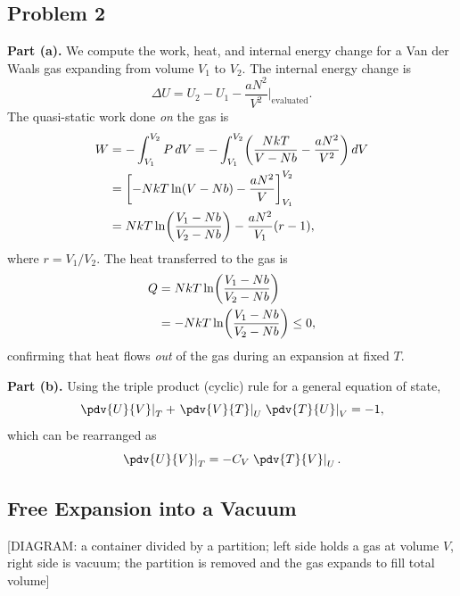 \subsection*{Problem 2}

\textbf{Part (a).} We compute the work, heat, and internal energy change for a Van der Waals gas expanding from volume $V_1$ to $V_2$. The internal energy change is
\begin{equation}
    \Delta U = U_2 - U_1 - \frac{aN^2}{V^2}\bigg|_{\text{evaluated}}.
\end{equation}
The quasi-static work done \emph{on} the gas is
\begin{align}
    W &= -\int_{V_1}^{V_2} P\,dV = -\int_{V_1}^{V_2}\!\left(\frac{NkT}{V - Nb} - \frac{aN^2}{V^2}\right)dV \notag\\
    &= \left[-NkT\ln(V - Nb) - \frac{aN^2}{V}\right]_{V_1}^{V_2} \notag\\
    &= NkT\ln\!\left(\frac{V_1 - Nb}{V_2 - Nb}\right) - \frac{aN^2}{V_1}(r - 1),
\end{align}
where $r = V_1/V_2$. The heat transferred to the gas is
\begin{align}
    Q &= NkT\ln\!\left(\frac{V_1 - Nb}{V_2 - Nb}\right) \notag\\
    &= -NkT\ln\!\left(\frac{V_1 - Nb}{V_2 - Nb}\right) \leq 0,
\end{align}
confirming that heat flows \emph{out} of the gas during an expansion at fixed $T$.

\textbf{Part (b).} Using the triple product (cyclic) rule for a general equation of state,
\begin{equation}
    \left.\pdv{U}{V}\right|_T + \left.\pdv{V}{T}\right|_U \left.\pdv{T}{U}\right|_V = -1,
\end{equation}
which can be rearranged as
\begin{equation}
    \left.\pdv{U}{V}\right|_T = -C_V \left.\pdv{T}{V}\right|_U.
\end{equation}

\subsection*{Free Expansion into a Vacuum}

\begin{center}[DIAGRAM: a container divided by a partition; left side holds a gas at volume $V$, right side is vacuum; the partition is removed and the gas expands to fill total volume]\end{center}

